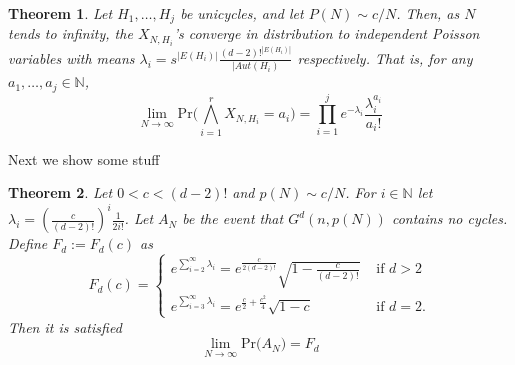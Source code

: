 \documentclass[11pt,notitlepage,a4paper]{article}
\newtheorem{theorem}{Theorem}[section]
\theoremstyle{definition}
\newcommand{\N}{\mathbb{N}}
\newcommand{\LN}{\lim\limits_{N\to \infty}}
\begin{document}
\begin{theorem} \label{thm:probunicycliccomponents}
	Let $H_1,\dots, H_j$ be unicycles, and let $P(N)\sim c/N$. 
	Then, as $N$ tends to infinity, the $X_{N,H_i}$'s converge in 
	distribution to independent Poisson variables with means
	$\lambda_i=s^{|E(H_i)|}\frac{(d-2)!^{|E(H_i)|}}{|Aut(H_i)}$
	respectively. That is, for any $a_1,\dots, a_j\in \N$,
	\[
	\LN \mathrm{Pr}\Big(
	\bigwedge_{i=1}^r
	X_{N,H_i}=a_i		
	\Big)= \prod_{i=1}^{j} e^{-\lambda_i}\frac{\lambda_i^{a_i}}{a_i!}
	\]
\end{theorem} 

Next we show some stuff




\begin{theorem} 
	Let $0<c<(d-2)!$ and $p(N)\sim c/N$. For $i\in \N$ let 
	$\lambda_i=\left(\frac{c}{(d-2)!}\right)^i\frac{1}{2i!}$. 
	Let $A_N$ be the event that $G^d(n,p(N))$ contains no cycles. 
	Define $F_d:=F_d(c)$ as
	\[
	F_d(c)=\begin{cases}
	e^{\sum_{i=2}^{\infty} \lambda_i}=
	e^{\frac{c}{2(d-2)!}}\sqrt{1-\frac{c}{(d-2)!}} & \text{ if } d>2\\
	e^{\sum_{i=3}^{\infty} \lambda_i}=
	e^{\frac{c}{2}+\frac{c^2}{4}}\sqrt{1-c} & \text{ if } d=2.
	\end{cases}
	\]
	Then it is satisfied
	\[
	\LN \mathrm{Pr}\big(A_N \big)=F_d
	\]	
\end{theorem} 
\end{document}
